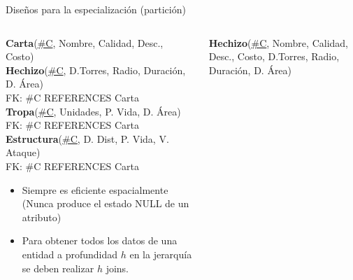 \begin{frame}{Dise\~nos para la especializaci\'on (partici\'on)}

    \begin{columns}[T]

        \begin{column}{0.48\linewidth}
            \begin{scriptsize}
                
                \textbf{Carta}(\underline{\#C}, Nombre, Calidad, Desc., Costo)\\[2mm]
                \textbf{Hechizo}(\underline{\#C}, D.Torres, Radio, Duraci\'on, D. \'Area)\\[1mm]
                \hspace{4mm} FK: \#C REFERENCES Carta \\[2mm]
                \textbf{Tropa}(\underline{\#C}, Unidades, P. Vida, D. \'Area)\\[1mm]
                \hspace{4mm} FK: \#C REFERENCES Carta \\[2mm]
                
                \textbf{Estructura}(\underline{\#C}, D. Dist, P. Vida, V. Ataque)\\[1mm]
                \hspace{4mm} FK: \#C REFERENCES Carta\\[2mm]
            \end{scriptsize}
            \vspace{5mm}

            \begin{itemize}
                \item Siempre es eficiente espacialmente (Nunca produce el estado NULL de un atributo)
                \item Para obtener todos los datos de una entidad a profundidad $h$ en la jerarqu\'ia se
                deben realizar $h$ joins.
            \end{itemize}

        \end{column}

        \begin{column}{0.48\linewidth}

            \begin{scriptsize}
                \textbf{Hechizo}(\underline{\#C}, Nombre, Calidad, Desc., Costo, D.Torres, Radio, Duraci\'on, D. \'Area)\\[1mm]
               

\end{scriptsize}
\end{column}
\end{columns}
\end{frame}
